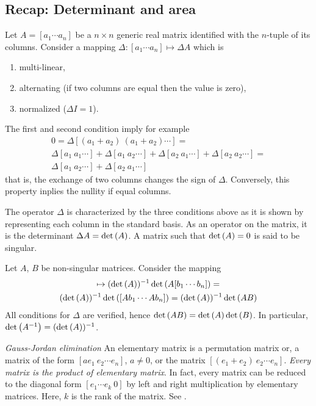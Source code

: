 \documentclass[12pt,a4paper]{amsart}
\theoremstyle{plain}%
\theoremstyle{definition}
\theoremstyle{remark}
\begin{document}
\subsection{Recap: Determinant and area}
Let $A = [a_1 \cdots a_n]$ be a $n \times n$ generic real matrix identified with the $n$-tuple of its columns. Consider a mapping $\Delta \colon [a_1 \cdots a_n] \mapsto \Delta A$ which is  
\begin{enumerate}
\item multi-linear,
\item alternating (if two columns are equal then the value is zero),
\item normalized ($\Delta I = 1$).
\end{enumerate}
The first and second condition imply for example
\begin{multline*}
0 = \Delta[(a_1+a_2)\ (a_1+a_2) \cdots] = \\ \Delta[a_1\ a_1 \cdots] + \Delta[a_1\ a_2 \cdots] + \Delta[a_2\ a_1 \cdots] + \Delta[a_2 \ a_2 \cdots] = \\ \Delta[a_1\ a_2 \cdots] + \Delta[a_2\ a_1 \cdots]
\end{multline*}
that is, the exchange of two columns changes the sign of $\Delta$. Conversely, this property inplies the nullity if equal columns.

The operator $\Delta$ is characterized by the three conditions above
as it is shown by representing each column in the standard basis. As
an operator on the matrix, it is the determinant  $\Delta A = \operatorname{det}\left(A\right)$. A matrix such that $\operatorname{det}\left(A\right) = 0$ is said to be singular.

Let $A$, $B$ be non-singular matrices. Consider the mapping
\begin{multline*}
[b_1 \cdots b_n]  \mapsto (\detof A)^{-1} \detof{A[b_1 \cdots b_n]} = \\
(\detof A)^{-1} \detof{[Ab_1 \cdots Ab_n]} = (\detof A)^{-1} \detof{AB} 
 \end{multline*}
All conditions for $\Delta$ are verified, hence $\operatorname{det}\left(AB\right) = \operatorname{det}\left(A\right) \operatorname{det}\left(B\right)$. In particular, $\operatorname{det}\left(A^{-1}\right) = (\operatorname{det}\left(A\right))^{-1}$.

\emph{Gauss-Jordan elimination} An elementary matrix is a permutation
matrix or, a matrix of the form $[ae_1 \ e_2 \cdots e_n]$, $a \neq 0$,
or the matrix $[(e_1+e_2) \ e_2 \cdots e_n]$. \emph{Every matrix is
  the product of elementary matrix}. In fact, every matrix can be
reduced to the diagonal form $[e_1 \cdots e_k \ 0]$ by left and right
multiplication by elementary matrices. Here, $k$ is the rank of the
matrix. See \cite[Sec.~2.23]{rudin:1987-3rd}.
\end{document}
